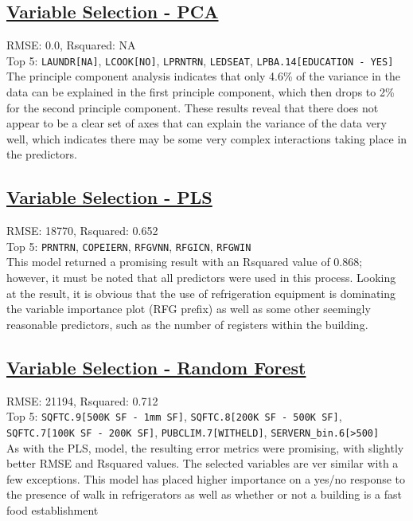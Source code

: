 \subsection{\hyperref[appendix:electricity:pca]{Variable Selection - PCA}}
RMSE: 0.0, Rsquared: NA\\
Top 5: \lstinline{LAUNDR[NA]}, \lstinline{LCOOK[NO]}, \lstinline{LPRNTRN}, \lstinline{LEDSEAT}, \lstinline{LPBA.14[EDUCATION - YES]}
\\[0.1in]
\indent The principle component analysis indicates that only 4.6\% of the variance in the data can be explained in the first principle component, which then drops to 2\% for the second principle component.  These results reveal that there does not appear to be a clear set of axes that can explain the variance of the data very well, which indicates there may be some very complex interactions taking place in the predictors.

\subsection{\hyperref[appendix:electricity:pls]{Variable Selection - PLS}}
RMSE: 18770, Rsquared: 0.652\\
Top 5: \lstinline{PRNTRN}, \lstinline{COPEIERN}, \lstinline{RFGVNN}, \lstinline{RFGICN}, \lstinline{RFGWIN}
\\[0.1in]
\indent This model returned a promising result with an Rsquared value of 0.868; however, it must be noted that all predictors were used in this process.  Looking at the result, it is obvious that the use of refrigeration equipment is dominating the variable importance plot (RFG prefix) as well as some other seemingly reasonable predictors, such as the number of registers within the building.  

\subsection{\hyperref[appendix:electricity:rf]{Variable Selection - Random Forest}}
RMSE: 21194, Rsquared: 0.712\\
Top 5: \lstinline{SQFTC.9[500K SF - 1mm SF]}, \lstinline{SQFTC.8[200K SF - 500K SF]}, \lstinline{SQFTC.7[100K SF - 200K SF]}, \lstinline{PUBCLIM.7[WITHELD]}, \lstinline{SERVERN_bin.6[>500]}
\\[0.1in]
\indent As with the PLS, model, the resulting error metrics were promising, with slightly better RMSE and Rsquared values.  The selected variables are ver similar with a few exceptions.  This model has placed higher importance on a yes/no response to the presence of walk in refrigerators as well as whether or not a building is a fast food establishment

